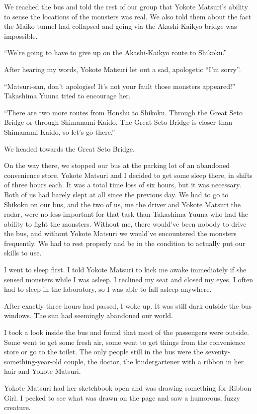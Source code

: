 We reached the bus and told the rest of our group that Yokote Matsuri's ability to sense the locations of the monsters was real. We also told them about the fact the Maiko tunnel had collapsed and going via the Akashi-Kaikyo bridge was impossible.

``We're going to have to give up on the Akashi-Kaikyo route to Shikoku.''

After hearing my words, Yokote Matsuri let out a sad, apologetic ``I'm sorry''.

``Matsuri-san, don't apologise! It's not your fault those monsters appeared!'' Takashima Yuuna tried to encourage her.

``There are two more routes from Honshu to Shikoku. Through the Great Seto Bridge or through Shimanami Kaido. The Great Seto Bridge is closer than Shimanami Kaido, so let's go there.''

We headed towards the Great Seto Bridge.

On the way there, we stopped our bus at the parking lot of an abandoned convenience store. Yokote Matsuri and I decided to get some sleep there, in shifts of three hours each. It was a total time loss of six hours, but it was necessary. Both of us had barely slept at all since the previous day. We had to go to Shikoku on our bus, and the two of us, me the driver and Yokote Matsuri the radar, were no less important for that task than Takashima Yuuna who had the ability to fight the monsters. Without me, there would've been nobody to drive the bus, and without Yokote Matsuri we would've encountered the monsters frequently. We had to rest properly and be in the condition to actually put our skills to use.

I went to sleep first. I told Yokote Matsuri to kick me awake immediately if she sensed monsters while I was asleep. I reclined my seat and closed my eyes. I often had to sleep in the laboratory, so I was able to fall asleep anywhere.

After exactly three hours had passed, I woke up. It was still dark outside the bus windows. The sun had seemingly abandoned our world.

I took a look inside the bus and found that most of the passengers were outside. Some went to get some fresh air, some went to get things from the convenience store or go to the toilet. The only people still in the bus were the seventy-something-year-old couple, the doctor, the kindergartener with a ribbon in her hair and Yokote Matsuri.

Yokote Matsuri had her sketchbook open and was drawing something for Ribbon Girl. I peeked to see what was drawn on the page and saw a humorous, fuzzy creature.

